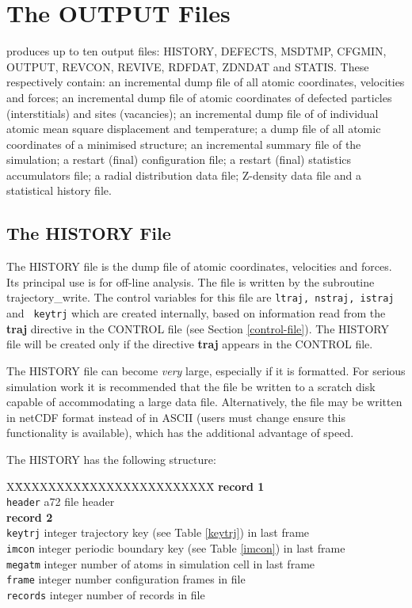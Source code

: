 \section{The OUTPUT Files}
\label{output-files}

\D produces up to ten output files: HISTORY, DEFECTS, MSDTMP,
CFGMIN, OUTPUT, REVCON, REVIVE, RDFDAT, ZDNDAT and STATIS.
These respectively contain: an incremental dump file of all
atomic coordinates, velocities and forces; an incremental
dump file of atomic coordinates of defected particles
(interstitials) and sites (vacancies); an incremental dump
file of of individual atomic mean square displacement and
temperature; a dump file of all atomic coordinates of a
minimised structure; an incremental summary file of the
simulation; a restart (final) configuration file; a restart
(final) statistics accumulators file; a radial distribution
data file; Z-density data file and a statistical history file.

\subsection{The HISTORY File}
\label{history-file}

The HISTORY file is the dump file of atomic coordinates, velocities
and forces.  Its principal use is for off-line analysis.  The file
is written by the subroutine {\sc trajectory\_write}.  The control
variables for this file are {\tt ltraj, nstraj, istraj} and {\tt
keytrj} which are created internally, based on information read from
the {\bf traj} directive in the CONTROL file (see Section
\ref{control-file}).  The HISTORY file will be created only if the
directive {\bf traj} appears in the CONTROL file.

The HISTORY file can become {\em very} large, especially if it is
formatted.  For serious simulation work it is recommended that the
file be written to a scratch disk capable of accommodating a large
data file.  Alternatively, the file may be written in netCDF format
instead of in ASCII (users must change ensure this functionality is
available), which has the additional advantage of speed.

The HISTORY has the following structure:
\begin{tabbing}
X\=XXXXXXXX\=XXXXXXXXXXXXXXXX\=\kill
{\bf record 1} \\
\> {\tt header}  \> a72     \> file header \\
{\bf record 2} \\
\> {\tt keytrj}  \> integer \> trajectory key (see Table \ref{keytrj}) in last frame \\
\> {\tt imcon}   \> integer \> periodic boundary key (see Table \ref{imcon}) in last frame \\
\> {\tt megatm}  \> integer \> number of atoms in simulation cell in last frame \\
\> {\tt frame}   \> integer \> number configuration frames in file \\
\> {\tt records} \> integer \> number of records in file \\
\end{tabbing}

